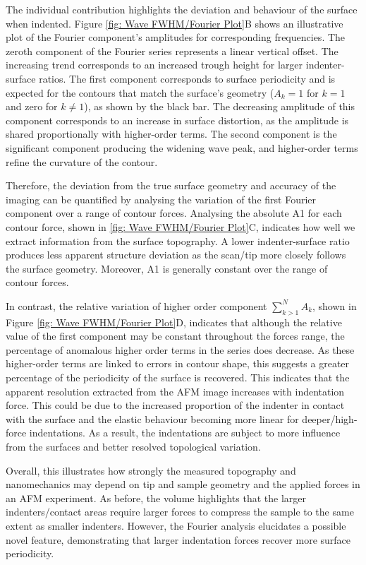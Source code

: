The individual contribution highlights the deviation and behaviour of the surface when indented. Figure \ref{fig: Wave FWHM/Fourier Plot}B shows an illustrative plot of the Fourier component's amplitudes for corresponding frequencies. The zeroth component of the Fourier series represents a linear vertical offset. The increasing trend corresponds to an increased trough height for larger indenter-surface ratios. The first component corresponds to surface periodicity and is expected for the contours that match the surface's geometry ($A_k = 1$ for $k=1$ and zero for $k\neq 1$), as shown by the black bar. The decreasing amplitude of this component corresponds to an increase in surface distortion, as the amplitude is shared proportionally with higher-order terms. The second component is the significant component producing the widening wave peak, and higher-order terms refine the curvature of the contour.

Therefore, the deviation from the true surface geometry and accuracy of the imaging can be quantified by analysing the variation of the first Fourier component over a range of contour forces. Analysing the absolute A1 for each contour force, shown in \ref{fig: Wave FWHM/Fourier Plot}C, indicates how well we extract information from the surface topography. A lower indenter-surface ratio produces less apparent structure deviation as the scan/tip more closely follows the surface geometry. Moreover, A1 is generally constant over the range of contour forces. 

In contrast, the relative variation of higher order component $\sum^N_{k>1} A_k$, shown in Figure \ref{fig: Wave FWHM/Fourier Plot}D, indicates that although the relative value of the first component may be constant throughout the forces range, the percentage of anomalous higher order terms in the series does decrease. As these higher-order terms are linked to errors in contour shape, this suggests a greater percentage of the periodicity of the surface is recovered. This indicates that the apparent resolution extracted from the AFM image increases with indentation force. This could be due to the increased proportion of the indenter in contact with the surface and the elastic behaviour becoming more linear for deeper/high-force indentations. As a result, the indentations are subject to more influence from the surfaces and better resolved topological variation. 

Overall, this illustrates how strongly the measured topography and nanomechanics may depend on tip and sample geometry and the applied forces in an AFM experiment. As before, the volume highlights that the larger indenters/contact areas require larger forces to compress the sample to the same extent as smaller indenters. However, the Fourier analysis elucidates a possible novel feature, demonstrating that larger indentation forces recover more surface periodicity.

